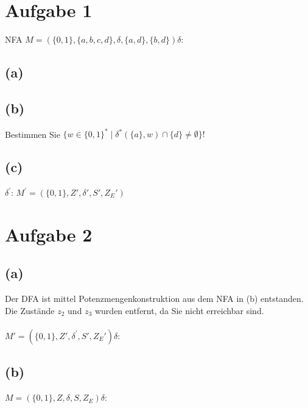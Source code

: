 \documentclass[titlepage]{article}
\renewcommand{\]}{\right]}
\renewcommand{\[}{\left[}
\renewcommand{\)}{\right)}
\renewcommand{\(}{\left(}
\renewcommand{\|}{\;|\;}
\renewcommand{\l}{\linebreak}
\begin{document}
\begingroup\let\clearpage\relax
	
	
	\section*{Aufgabe 1}
		\tab NFA $M=(\{0,1\},\{a,b,c,d\},\delta,\{a,d\},\{b,d\})$\tab$\delta$:\l
		\begin{center}
			
			
		\end{center}
	
		\subsection*{(a)}
			
			
			
		\subsection*{(b)}Bestimmen Sie $\{w\in\{0,1\}^*\mid\delta^*(\{a\},w)\cap\{d\}\neq\emptyset\}!$
			
			
		\subsection*{(c)}
		\begin{center}
			
			$\delta^{'}$:\l
			\l
			$M^{'}=(\{0,1\},Z',\delta',S',Z_E')$
		\end{center}
	\section*{Aufgabe 2}
	\subsection*{(a)}
		Der DFA ist mittel Potenzmengenkonstruktion aus dem NFA in (b) entstanden. Die Zustände $z_2$ und $z_3$ wurden entfernt, da Sie nicht erreichbar sind. \\\\
		\tab$M'=(\{0,1\},Z',\delta^{'},S',Z_E')$\tab$\delta$:\\
		\begin{center}
			
			
		\end{center}
	\subsection*{(b)}
		\tab$M=(\{0,1\},Z,\delta,S,Z_E)$\tab$\delta$:\\
		\begin{center}
			
			
		\end{center}
	
\end{document}
